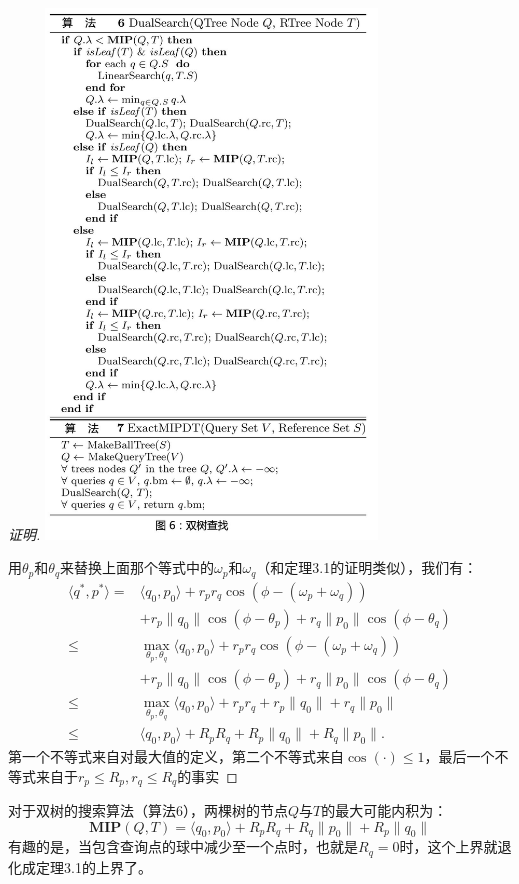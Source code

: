 \documentclass[twocolumn]{article}
\begin{document}
\begin{proof}[证明]
\includegraphics[width=250pt,clip,trim=10 0 0 0]{fig06.jpg}

用$\theta_p$和$\theta_q$来替换上面那个等式中的$\omega_p$和$\omega_q$（和定理3.1的证明类似），我们有：
\begin{align*}
\langle q^*,p^* \rangle =
    & \langle q_0,p_0 \rangle + r_p r_q\cos(\phi-(\omega_p+\omega_q)) \\
    & + r_p\|q_0\|\cos(\phi-\theta_p)+r_q\|p_0\|\cos(\phi-\theta_q) \\
\le & \max_{\theta_p,\theta_q}\langle q_0,p_0 \rangle + r_p r_q\cos(\phi-(\omega_p+\omega_q)) \\
    & + r_p\|q_0\|\cos(\phi-\theta_p)+r_q\|p_0\|\cos(\phi-\theta_q) \\
\le & \max_{\theta_p,\theta_q}\langle q_0,p_0 \rangle + r_p r_q + r_p\|q_0\| + r_q\|p_0\| \\
\le & \langle q_0,p_0 \rangle + R_p R_q + R_p\|q_0\| + R_q\|p_0\|.
\end{align*}
第一个不等式来自对最大值的定义，第二个不等式来自$\cos(\cdot)\le1$，最后一个不等式来自于$r_p \le R_p, r_q \le R_q$的事实
\end{proof}
对于双树的搜索算法（算法6），两棵树的节点$Q$与$T$的最大可能内积为：
\begin{equation*}
\mathbf{MIP}(Q,T)=\langle q_0,p_0 \rangle + R_p R_q + R_q\|p_0\| + R_p\|q_0\|
\end{equation*}
有趣的是，当包含查询点的球中减少至一个点时，也就是$R_q = 0$时，这个上界就退化成定理3.1的上界了。
\end{document}
